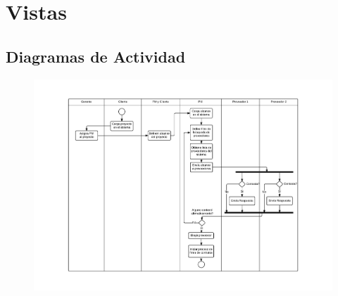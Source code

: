 \section{Vistas}





\subsection{Diagramas de Actividad}
\begin{figure}[H]
\includegraphics[width=\linewidth]{diag/viejos/actividad.pdf}
\end{figure}

